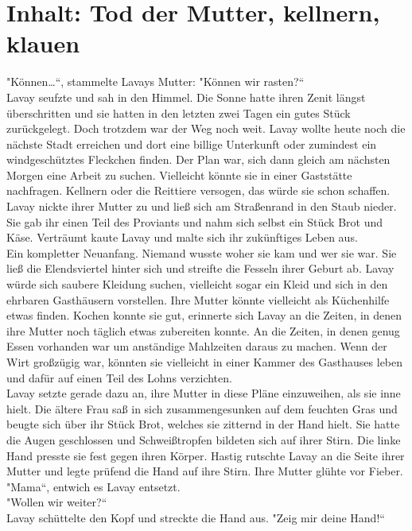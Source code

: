 \chapter{Inhalt: Tod der Mutter, kellnern, klauen}


"Können…``, stammelte Lavays Mutter: "Können wir rasten?``\\
Lavay seufzte und sah in den Himmel. Die Sonne hatte ihren Zenit längst überschritten und sie 
hatten in den letzten zwei Tagen ein gutes Stück zurückgelegt. Doch trotzdem war der Weg noch weit. 
Lavay wollte heute noch die nächste Stadt erreichen und dort eine billige Unterkunft oder 
zumindest ein windgeschütztes Fleckchen finden. Der Plan war, sich dann gleich am nächsten Morgen 
eine Arbeit zu suchen. Vielleicht könnte sie in einer Gaststätte nachfragen. Kellnern oder die 
Reittiere versogen, das würde sie schon schaffen. Lavay nickte ihrer Mutter zu und ließ sich am 
Straßenrand in den Staub nieder. Sie gab ihr einen Teil des Proviants und nahm sich selbst ein Stück 
Brot und Käse. Verträumt kaute Lavay und malte sich ihr zukünftiges Leben aus. \\
Ein kompletter Neuanfang. Niemand wusste woher sie kam und wer sie war. Sie ließ die Elendsviertel 
hinter sich und streifte die Fesseln ihrer Geburt ab. Lavay würde sich saubere Kleidung suchen, 
vielleicht sogar ein Kleid und sich in den ehrbaren Gasthäusern vorstellen. Ihre Mutter könnte 
vielleicht als Küchenhilfe etwas finden. Kochen konnte sie gut, erinnerte sich 
Lavay an die Zeiten, in denen ihre Mutter noch täglich etwas zubereiten konnte. An die Zeiten, in 
denen genug Essen vorhanden war um anständige Mahlzeiten daraus zu machen. Wenn der Wirt großzügig 
war, könnten sie vielleicht in einer Kammer des Gasthauses leben und dafür auf einen Teil des Lohns 
verzichten.\\
Lavay setzte gerade dazu an, ihre Mutter in diese Pläne einzuweihen, als sie inne hielt. Die ältere 
Frau saß in sich zusammengesunken auf dem feuchten Gras und beugte sich über ihr Stück Brot, 
welches sie zitternd in der Hand hielt. Sie hatte die Augen geschlossen und Schweißtropfen 
bildeten sich auf ihrer Stirn. Die linke Hand presste sie fest gegen ihren Körper. Hastig rutschte 
Lavay an die Seite ihrer Mutter und legte prüfend die Hand auf ihre Stirn. Ihre Mutter glühte vor 
Fieber.\\
"Mama``, entwich es Lavay entsetzt.\\
"Wollen wir weiter?``\\
Lavay schüttelte den Kopf und streckte die Hand aus. "Zeig mir deine Hand!``\\
